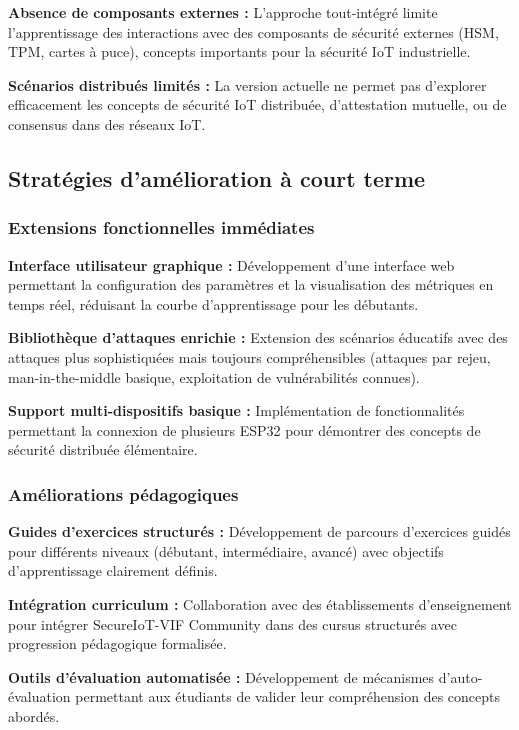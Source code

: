 \textbf{Absence de composants externes :} L'approche tout-intégré limite l'apprentissage des interactions avec des composants de sécurité externes (HSM, TPM, cartes à puce), concepts importants pour la sécurité IoT industrielle.

\textbf{Scénarios distribués limités :} La version actuelle ne permet pas d'explorer efficacement les concepts de sécurité IoT distribuée, d'attestation mutuelle, ou de consensus dans des réseaux IoT.

\subsection{Stratégies d'amélioration à court terme}

\subsubsection{Extensions fonctionnelles immédiates}

\textbf{Interface utilisateur graphique :} Développement d'une interface web permettant la configuration des paramètres et la visualisation des métriques en temps réel, réduisant la courbe d'apprentissage pour les débutants.

\textbf{Bibliothèque d'attaques enrichie :} Extension des scénarios éducatifs avec des attaques plus sophistiquées mais toujours compréhensibles (attaques par rejeu, man-in-the-middle basique, exploitation de vulnérabilités connues).

\textbf{Support multi-dispositifs basique :} Implémentation de fonctionnalités permettant la connexion de plusieurs ESP32 pour démontrer des concepts de sécurité distribuée élémentaire.

\subsubsection{Améliorations pédagogiques}

\textbf{Guides d'exercices structurés :} Développement de parcours d'exercices guidés pour différents niveaux (débutant, intermédiaire, avancé) avec objectifs d'apprentissage clairement définis.

\textbf{Intégration curriculum :} Collaboration avec des établissements d'enseignement pour intégrer SecureIoT-VIF Community dans des cursus structurés avec progression pédagogique formalisée.

\textbf{Outils d'évaluation automatisée :} Développement de mécanismes d'auto-évaluation permettant aux étudiants de valider leur compréhension des concepts abordés.

